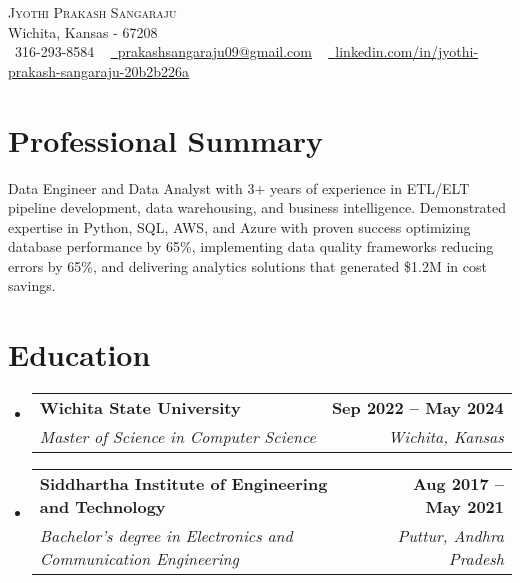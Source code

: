 \documentclass[letterpaper,11pt]{article}
\makeatletter
\newcommand{\resumeSubheading}[4]{
  \vspace{-2pt}\item
    \begin{tabular*}{1.0\textwidth}[t]{l@{\extracolsep{\fill}}r}
      \textbf{#1} & \textbf{\small #2} \\
      \textit{\small#3} & \textit{\small #4} \\
    \end{tabular*}\vspace{-7pt}
}
\newcommand{\resumeSubHeadingListStart}{\begin{itemize}[leftmargin=0.0in, label={}]}
\newcommand{\resumeSubHeadingListEnd}{\end{itemize}}
\makeatother
\begin{document}
\begin{center}
    {\Huge \scshape Jyothi Prakash Sangaraju} \\ \vspace{1pt}
    Wichita, Kansas - 67208\\ \vspace{1pt}
    \small \raisebox{-0.1\height}\faPhone\ 316-293-8584 ~ \href{mailto:prakashsangaraju09@gmail.com}{\raisebox{-0.2\height}\faEnvelope\  \underline{prakashsangaraju09@gmail.com}} ~ 
    \href{https://linkedin.com/in/jyothi-prakash-sangaraju-20b2b226a}{\raisebox{-0.2\height}\faLinkedin\ \underline{linkedin.com/in/jyothi-prakash-sangaraju-20b2b226a}}  ~
    \vspace{-8pt}
\end{center}


\section{Professional Summary}
\small{
Data Engineer and Data Analyst with 3+ years of experience in ETL/ELT pipeline development, data warehousing, and business intelligence. Demonstrated expertise in Python, SQL, AWS, and Azure with proven success optimizing database performance by 65\%, implementing data quality frameworks reducing errors by 65\%, and delivering analytics solutions that generated \$1.2M in cost savings.
}


\section{Education}
  \resumeSubHeadingListStart
    \resumeSubheading
      {Wichita State University}{Sep 2022 -- May 2024}
      {Master of Science in Computer Science}{Wichita, Kansas}
  \resumeSubHeadingListEnd
  \resumeSubHeadingListStart
    \resumeSubheading
      {Siddhartha Institute of Engineering and Technology}{Aug 2017 -- May 2021}
    {Bachelor's degree in Electronics and Communication Engineering}{Puttur, Andhra Pradesh}
  \resumeSubHeadingListEnd


\end{document}
